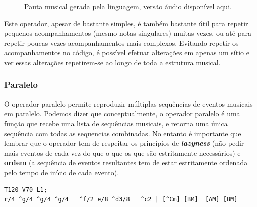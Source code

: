 \begin{figure}[ht]
  \centering
  {%
  \setlength{\fboxsep}{0pt}%
  \setlength{\fboxrule}{0pt}%
  }%
  \caption{Pauta musical gerada pela linguagem, versão áudio disponível \href{https://drive.google.com/open?id=1IIm8PQkLsNFMK9MNSVubJSG6SP6KwhPL}{\underline{aqui}}\protect\footnotemark.}
  \label{fig:ops-repetition}
\end{figure}


Este operador, apesar de bastante simples, é também bastante útil para repetir pequenos acompanhamentos (mesmo notas singulares) muitas vezes, ou até para repetir poucas vezes acompanhamentos mais complexos. Evitando repetir os acompanhamentos no código, é possível efetuar alterações em apenas um sítio e ver essas alterações repetirem-se ao longo de toda a estrutura musical.

\subsubsection{Paralelo}
O operador paralelo permite reproduzir múltiplas sequências de eventos musicais em paralelo. Podemos dizer que conceptualmente, o operador paralelo é uma função que recebe uma lista de sequências musicais, e retorna uma única sequência com todas as sequencias combinadas. No entanto é importante que lembrar que o operador tem de respeitar os princípios de \textit{\textbf{lazyness}} (não pedir mais eventos de cada vez do que o que os que são estritamente necessários) e \textbf{ordem} (a sequência de eventos resultantes tem de estar estritamente ordenada pelo tempo de início de cada evento).

\begin{lstlisting}[caption={Excerto da música \textit{Soft to Be Strong} de Marina},label=lst:ops-parallel,belowcaptionskip=-\medskipamount]
T120 V70 L1;
r/4 ^g/4 ^g/4 ^g/4   ^f/2 e/8 ^d3/8   ^c2 | [^Cm] [BM]  [AM] [BM] 
\end{lstlisting}

